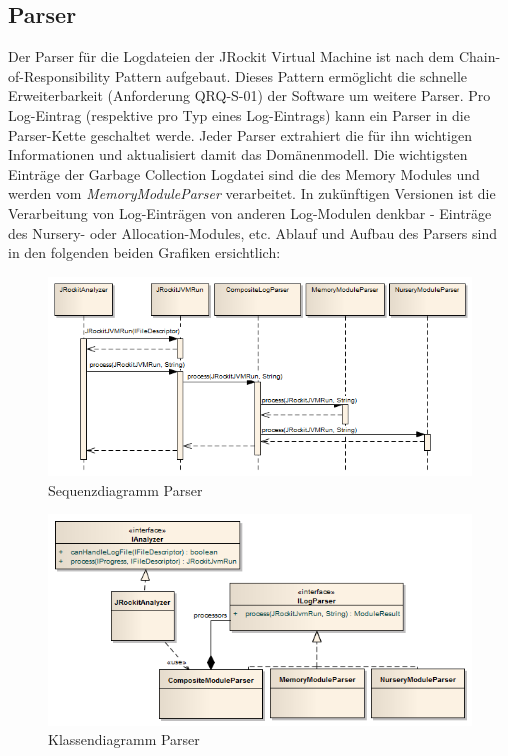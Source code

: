 \subsection{Parser}
Der Parser für die Logdateien der JRockit Virtual Machine ist nach dem Chain-of-Responsibility Pattern\cite{wiki:chainOfResponsibilityPattern} aufgebaut. Dieses Pattern ermöglicht die schnelle Erweiterbarkeit (Anforderung QRQ-S-01) der Software um weitere Parser. Pro Log-Eintrag (respektive pro Typ eines Log-Eintrags) kann ein Parser in die Parser-Kette geschaltet werde. Jeder Parser extrahiert die für ihn wichtigen Informationen und aktualisiert damit das Domänenmodell. Die wichtigsten Einträge der Garbage Collection Logdatei sind die des Memory Modules und werden vom \textit{MemoryModuleParser} verarbeitet. In zukünftigen Versionen ist die Verarbeitung von Log-Einträgen von anderen Log-Modulen denkbar - Einträge des Nursery- oder Allocation-Modules, etc. Ablauf und Aufbau des Parsers sind in den folgenden beiden Grafiken ersichtlich:

 \begin{figure}[H]
  	\centering
    	\includegraphics[width=16cm]{images/acitivity_parse_prozess}
        	\caption{Sequenzdiagramm Parser}
\end{figure}
 \begin{figure}[H]
  	\centering
    	\includegraphics[width=16cm]{images/jrockit_log_processing}
        	\caption{Klassendiagramm Parser}
\end{figure}

